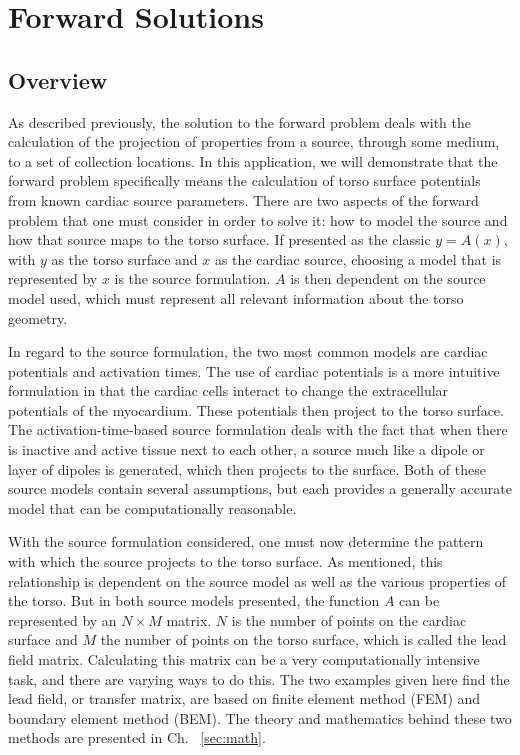 \chapter{Forward Solutions}\label{ch:fwd}

\section{Overview}

As described previously, the solution to the forward problem deals with the calculation of the projection of properties from a source, through some medium, to a set of collection locations. In this application, we will demonstrate that the forward problem specifically means the calculation of torso surface potentials from known cardiac source parameters. There are two aspects of the forward problem that one must consider in order to solve it: how to model the source and how that source maps to the torso surface. If presented as the classic $y=A(x)$,  with $y$ as the torso surface and $x$ as the cardiac source, choosing a model that is represented by $x$ is the source formulation. $A$ is then dependent on the source model used, which must represent all relevant information about the torso geometry.

In regard to the source formulation, the two most common models are cardiac potentials and activation times. The use of cardiac potentials is a more intuitive formulation in that the cardiac cells interact to change the extracellular potentials of the myocardium. These potentials then project to the torso surface. The activation-time-based source formulation deals with the fact that when there is inactive and active tissue next to each other, a source much like a dipole or layer of dipoles is generated, which then projects to the surface. Both of these source models contain several assumptions, but each provides a generally accurate model that can be computationally reasonable.

With the source formulation considered, one must now determine the pattern with which the source projects to the torso surface. As mentioned, this relationship is dependent on the source model as well as the various properties of the torso. But in both source models presented, the function $A$ can be represented by an $N \times M$ matrix. $N$ is the number of points on the cardiac surface and $M$ the number of points on the torso surface, which is called the lead field matrix. Calculating this matrix can be a very computationally intensive task, and there are varying ways to do this. The two examples given here find the lead field, or transfer matrix, are based on finite element method (FEM) and boundary element method (BEM). The theory and mathematics behind these two methods are presented in Ch. ~\ref{sec:math}.

